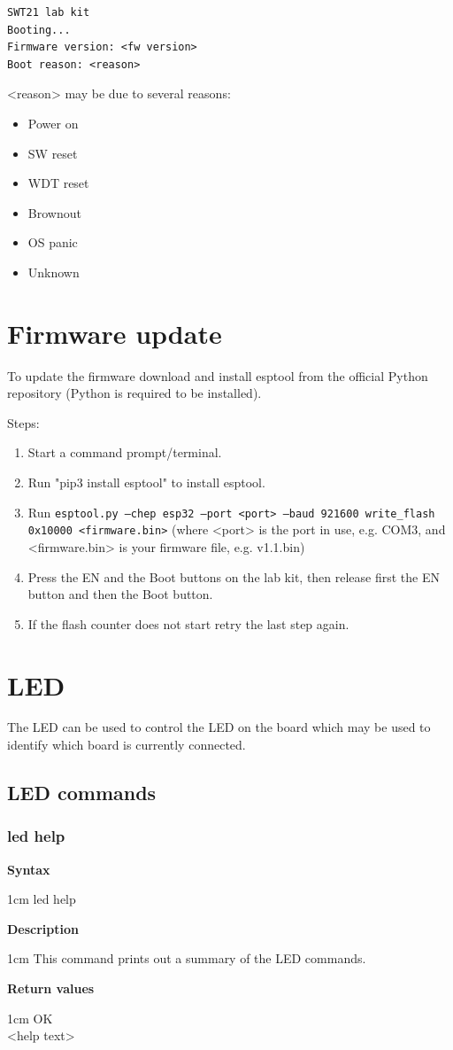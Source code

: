 \documentclass{article}[a4paper]
\begin{document}
\begin{verbatim}
SWT21 lab kit
Booting...
Firmware version: <fw version>
Boot reason: <reason>
\end{verbatim}

<reason> may be due to several reasons:
\begin{itemize}[noitemsep]
\item Power on
\item SW reset
\item WDT reset
\item Brownout
\item OS panic
\item Unknown
\end{itemize}

\section{Firmware update}
To update the firmware download and install esptool from the official Python
repository (Python is required to be installed).

Steps:
\begin{enumerate}
\item Start a command prompt/terminal.
\item Run "pip3 install esptool" to install esptool.
\item Run \texttt{esptool.py --chep esp32 --port <port> --baud 921600 write\_flash 0x10000 <firmware.bin>} (where <port> is the port in use, e.g. COM3, and <firmware.bin> is your firmware file, e.g. v1.1.bin)
\item Press the EN and the Boot buttons on the lab kit, then release first the EN
      button and then the Boot button.
\item If the flash counter does not start retry the last step again.
\end{enumerate}

\section{LED}
The LED can be used to control the LED on the board which may be used to
identify which board is currently connected.

\subsection{LED commands}
\subsubsection{led help}
\begin{tcolorbox}
	{\bf Syntax}

	 1cm \dimexpr\linewidth-2cm\relax
	led help

	\medskip
	{\bf Description}

	 1cm \dimexpr\linewidth-2cm\relax
	This command prints out a summary of the LED commands.

	\medskip
	{\bf Return values}

	 1cm \dimexpr\linewidth-2cm\relax
	OK \\
	<help text>
\end{tcolorbox}
\end{document}
